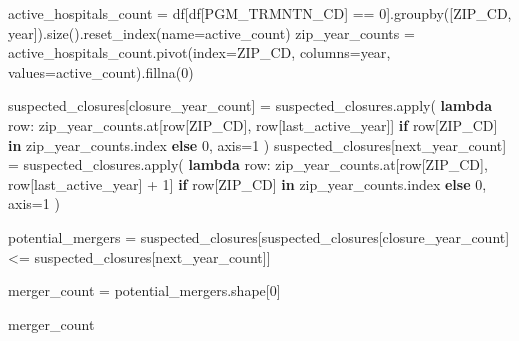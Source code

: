 \documentclass[
  letterpaper,
  DIV=11,
  numbers=noendperiod]{scrartcl}
\newenvironment{Shaded}{\begin{snugshade}}{\end{snugshade}}
\newcommand{\BuiltInTok}[1]{\textcolor[rgb]{0.00,0.23,0.31}{#1}}
\newcommand{\ControlFlowTok}[1]{\textcolor[rgb]{0.00,0.23,0.31}{\textbf{#1}}}
\newcommand{\DecValTok}[1]{\textcolor[rgb]{0.68,0.00,0.00}{#1}}
\newcommand{\KeywordTok}[1]{\textcolor[rgb]{0.00,0.23,0.31}{\textbf{#1}}}
\newcommand{\NormalTok}[1]{\textcolor[rgb]{0.00,0.23,0.31}{#1}}
\newcommand{\OperatorTok}[1]{\textcolor[rgb]{0.37,0.37,0.37}{#1}}
\newcommand{\StringTok}[1]{\textcolor[rgb]{0.13,0.47,0.30}{#1}}
\begin{document}
\begin{Shaded}
\begin{Highlighting}[]
\NormalTok{active\_hospitals\_count }\OperatorTok{=}\NormalTok{ df[df[}\StringTok{\textquotesingle{}PGM\_TRMNTN\_CD\textquotesingle{}}\NormalTok{] }\OperatorTok{==} \DecValTok{0}\NormalTok{].groupby([}\StringTok{\textquotesingle{}ZIP\_CD\textquotesingle{}}\NormalTok{, }\StringTok{\textquotesingle{}year\textquotesingle{}}\NormalTok{]).size().reset\_index(name}\OperatorTok{=}\StringTok{\textquotesingle{}active\_count\textquotesingle{}}\NormalTok{)}
\NormalTok{zip\_year\_counts }\OperatorTok{=}\NormalTok{ active\_hospitals\_count.pivot(index}\OperatorTok{=}\StringTok{\textquotesingle{}ZIP\_CD\textquotesingle{}}\NormalTok{, columns}\OperatorTok{=}\StringTok{\textquotesingle{}year\textquotesingle{}}\NormalTok{, values}\OperatorTok{=}\StringTok{\textquotesingle{}active\_count\textquotesingle{}}\NormalTok{).fillna(}\DecValTok{0}\NormalTok{)}

\NormalTok{suspected\_closures[}\StringTok{\textquotesingle{}closure\_year\_count\textquotesingle{}}\NormalTok{] }\OperatorTok{=}\NormalTok{ suspected\_closures.}\BuiltInTok{apply}\NormalTok{(}
    \KeywordTok{lambda}\NormalTok{ row: zip\_year\_counts.at[row[}\StringTok{\textquotesingle{}ZIP\_CD\textquotesingle{}}\NormalTok{], row[}\StringTok{\textquotesingle{}last\_active\_year\textquotesingle{}}\NormalTok{]] }\ControlFlowTok{if}\NormalTok{ row[}\StringTok{\textquotesingle{}ZIP\_CD\textquotesingle{}}\NormalTok{] }\KeywordTok{in}\NormalTok{ zip\_year\_counts.index }\ControlFlowTok{else} \DecValTok{0}\NormalTok{, axis}\OperatorTok{=}\DecValTok{1}
\NormalTok{)}
\NormalTok{suspected\_closures[}\StringTok{\textquotesingle{}next\_year\_count\textquotesingle{}}\NormalTok{] }\OperatorTok{=}\NormalTok{ suspected\_closures.}\BuiltInTok{apply}\NormalTok{(}
    \KeywordTok{lambda}\NormalTok{ row: zip\_year\_counts.at[row[}\StringTok{\textquotesingle{}ZIP\_CD\textquotesingle{}}\NormalTok{], row[}\StringTok{\textquotesingle{}last\_active\_year\textquotesingle{}}\NormalTok{] }\OperatorTok{+} \DecValTok{1}\NormalTok{] }\ControlFlowTok{if}\NormalTok{ row[}\StringTok{\textquotesingle{}ZIP\_CD\textquotesingle{}}\NormalTok{] }\KeywordTok{in}\NormalTok{ zip\_year\_counts.index }\ControlFlowTok{else} \DecValTok{0}\NormalTok{, axis}\OperatorTok{=}\DecValTok{1}
\NormalTok{)}

\NormalTok{potential\_mergers }\OperatorTok{=}\NormalTok{ suspected\_closures[suspected\_closures[}\StringTok{\textquotesingle{}closure\_year\_count\textquotesingle{}}\NormalTok{] }\OperatorTok{\textless{}=}\NormalTok{ suspected\_closures[}\StringTok{\textquotesingle{}next\_year\_count\textquotesingle{}}\NormalTok{]]}

\NormalTok{merger\_count }\OperatorTok{=}\NormalTok{ potential\_mergers.shape[}\DecValTok{0}\NormalTok{]}

\NormalTok{merger\_count}
\end{Highlighting}
\end{Shaded}
\end{document}
